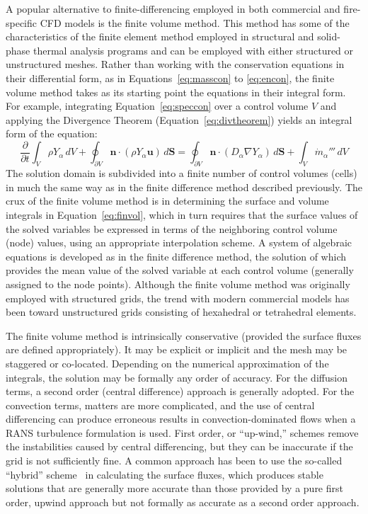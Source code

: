 \documentclass[graybox]{svmult}
\begin{document}
A popular alternative to finite-differencing employed in both commercial and fire-specific CFD models is the finite volume method. This method has some of the characteristics of the finite  element method employed in structural and solid-phase thermal analysis programs and can be employed with either structured or unstructured meshes. Rather than working with the conservation equations in their differential form, as in Equations~\ref{eq:masscon} to \ref{eq:encon}, the finite volume method takes as its starting point the equations in their integral form. For example, integrating Equation~\ref{eq:speccon} over a control volume $V$  and applying the Divergence Theorem (Equation~\ref{eq:divtheorem}) yields an integral form of the equation:
\begin{equation}
\frac{\partial}{\partial t} \int_V \rho Y_\alpha \, dV + \oint_{\partial V} \mathbf{n} \cdot (\rho Y_\alpha \mathbf{u} ) \, d\mathbf{S} = \oint_{\partial V} \mathbf{n} \cdot (D_\alpha \nabla Y_\alpha) \, d\mathbf{S} + \int_V \dot{m}_\alpha''' \, dV
\label{eq:finvol}
\end{equation}
The solution domain is subdivided into a finite number of control volumes (cells) in much the same way as in the finite difference method described previously. The crux of the finite volume method is in determining the surface and volume integrals in Equation~\ref{eq:finvol}, which in turn requires that the surface values of the solved variables be expressed in terms of the neighboring control volume (node) values, using an appropriate interpolation scheme. A system of algebraic equations is developed as in the finite difference method, the solution of which provides the mean value of the solved variable at each control volume (generally assigned to the node points). Although the finite volume method was originally employed with structured grids, the trend with modern commercial models has been toward unstructured grids consisting of hexahedral or tetrahedral elements.

The finite volume method is intrinsically conservative (provided the surface fluxes are defined appropriately). It may be explicit or implicit and the mesh may be staggered or co-located. Depending on the numerical approximation of the integrals, the solution may be formally any order of accuracy. For the diffusion terms, a second order (central difference) approach is generally adopted. For the convection terms, matters are more complicated, and the use of central differencing can produce erroneous results in convection-dominated flows when a RANS turbulence formulation is used. First order, or ``up-wind,'' schemes remove the instabilities caused by central differencing, but they can be inaccurate if the grid is not sufficiently fine. A common approach has been to use the so-called ``hybrid'' scheme~\cite{Spalding:1972} in calculating the surface fluxes, which produces stable solutions that are generally more accurate than those provided by a pure first order, upwind approach but not formally as accurate as a second order approach.
\end{document}

